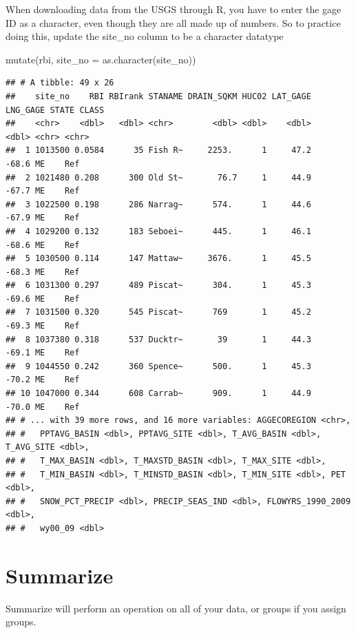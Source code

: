 \documentclass[
]{book}
\newenvironment{Shaded}{\begin{snugshade}}{\end{snugshade}}
\newcommand{\AttributeTok}[1]{\textcolor[rgb]{0.77,0.63,0.00}{#1}}
\newcommand{\FunctionTok}[1]{\textcolor[rgb]{0.00,0.00,0.00}{#1}}
\newcommand{\NormalTok}[1]{#1}
\begin{document}
When downloading data from the USGS through R, you have to enter the gage ID as a character, even though they are all made up of numbers. So to practice doing this, update the site\_no column to be a character datatype

\begin{Shaded}
\begin{Highlighting}[]
\FunctionTok{mutate}\NormalTok{(rbi, }\AttributeTok{site\_no =} \FunctionTok{as.character}\NormalTok{(site\_no))}
\end{Highlighting}
\end{Shaded}

\begin{verbatim}
## # A tibble: 49 x 26
##    site_no    RBI RBIrank STANAME DRAIN_SQKM HUC02 LAT_GAGE LNG_GAGE STATE CLASS
##    <chr>    <dbl>   <dbl> <chr>        <dbl> <dbl>    <dbl>    <dbl> <chr> <chr>
##  1 1013500 0.0584      35 Fish R~     2253.      1     47.2    -68.6 ME    Ref  
##  2 1021480 0.208      300 Old St~       76.7     1     44.9    -67.7 ME    Ref  
##  3 1022500 0.198      286 Narrag~      574.      1     44.6    -67.9 ME    Ref  
##  4 1029200 0.132      183 Seboei~      445.      1     46.1    -68.6 ME    Ref  
##  5 1030500 0.114      147 Mattaw~     3676.      1     45.5    -68.3 ME    Ref  
##  6 1031300 0.297      489 Piscat~      304.      1     45.3    -69.6 ME    Ref  
##  7 1031500 0.320      545 Piscat~      769       1     45.2    -69.3 ME    Ref  
##  8 1037380 0.318      537 Ducktr~       39       1     44.3    -69.1 ME    Ref  
##  9 1044550 0.242      360 Spence~      500.      1     45.3    -70.2 ME    Ref  
## 10 1047000 0.344      608 Carrab~      909.      1     44.9    -70.0 ME    Ref  
## # ... with 39 more rows, and 16 more variables: AGGECOREGION <chr>,
## #   PPTAVG_BASIN <dbl>, PPTAVG_SITE <dbl>, T_AVG_BASIN <dbl>, T_AVG_SITE <dbl>,
## #   T_MAX_BASIN <dbl>, T_MAXSTD_BASIN <dbl>, T_MAX_SITE <dbl>,
## #   T_MIN_BASIN <dbl>, T_MINSTD_BASIN <dbl>, T_MIN_SITE <dbl>, PET <dbl>,
## #   SNOW_PCT_PRECIP <dbl>, PRECIP_SEAS_IND <dbl>, FLOWYRS_1990_2009 <dbl>,
## #   wy00_09 <dbl>
\end{verbatim}

\hypertarget{summarize}{%
\section{Summarize}\label{summarize}}

Summarize will perform an operation on all of your data, or groups if you assign groups.
\end{document}
